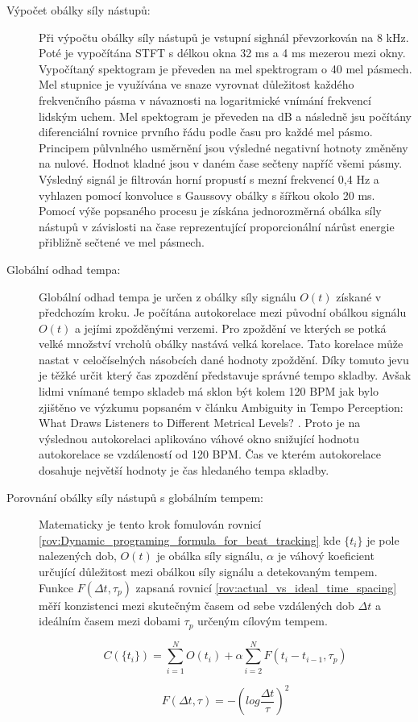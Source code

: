     \begin{description}
      \item[Výpočet obálky síly nástupů:] Při výpočtu obálky síly nástupů je vstupní sighnál převzorkován na 8 kHz. Poté je vypočítána \acs{STFT} s délkou okna 32 ms a 4 ms mezerou mezi okny. Vypočítaný spektogram je převeden na mel spektrogram o 40 mel pásmech. Mel stupnice je využívána ve snaze vyrovnat důležitost každého frekvenčního pásma v návaznosti na logaritmické vnímání frekvencí lidským uchem. Mel spektogram je převeden na dB a následně jsu počítány diferenciální rovnice prvního řádu podle času pro každé mel pásmo. Principem půlvnlného usměrnění jsou výsledné negativní hotnoty změněny na nulové. Hodnot kladné jsou v daném čase sečteny napříč všemi pásmy. Výsledný signál je filtrován horní propustí s mezní frekvencí 0,4 Hz a vyhlazen pomocí konvoluce s Gaussovy obálky s šířkou okolo 20 ms. Pomocí výše popsaného procesu je získána jednorozměrná obálka síly nástupů v závislosti na čase reprezentující proporcionální nárůst energie přibližně sečtené ve mel pásmech.
      \item[Globální odhad tempa:] Globální odhad tempa je určen z obálky síly signálu $O(t)$ získané v předchozím kroku. Je počítána autokorelace mezi původní obálkou signálu $O(t)$ a jejími zpožděnými verzemi. Pro zpoždění ve kterých se potká velké množství vrcholů obálky nastává velká korelace. Tato korelace může nastat v celočíselných násobcích dané hodnoty zpoždění. Díky tomuto jevu je těžké určit který čas zpozdění představuje správné tempo skladby. Avšak lidmi vnímané tempo skladeb má sklon být kolem 120 \acs{BPM} jak bylo zjištěno ve výzkumu popsaném v článku Ambiguity in Tempo Perception: What Draws Listeners to Different Metrical Levels? \cite{Ambiguity_in_tempo_perception}. Proto je na výslednou autokorelaci aplikováno váhové okno snižující hodnotu autokorelace se vzdáleností od 120 BPM. Čas ve kterém autokorelace dosahuje největší hodnoty je čas hledaného tempa skladby.  
      \item[Porovnání obálky síly nástupů s globálním tempem:] Matematicky je tento krok fomulován rovnicí \ref{rov:Dynamic_programing_formula_for_beat_tracking} kde $ \{t_i\} $ je pole nalezených dob, $O(t)$ je obálka síly signálu, $\alpha$ je váhový koeficient určující důležitost mezi obálkou síly signálu a detekovaným tempem. Funkce $F(\Delta t, \tau_p)$ zapsaná rovnicí \ref{rov:actual_vs_ideal_time_spacing} měří konzistenci mezi skutečným časem od sebe vzdálených dob $\Delta t$ a ideálním časem mezi dobami $ \tau_p$ určeným cílovým tempem.

      \begin{equation}
        C(\{t_i\}) = \sum_{i = 1}^{N} O(t_i) + \alpha \sum_{i = 2}^{N} F(t_i - t_{i-1}, \tau_p)
        \label{rov:Dynamic_programing_formula_for_beat_tracking}
      \end{equation}
  
      \begin{equation}
        F(\Delta t, \tau) = -(log \frac{\Delta t}{\tau})^2
        \label{rov:actual_vs_ideal_time_spacing}
      \end{equation}
    \end{description}
    
